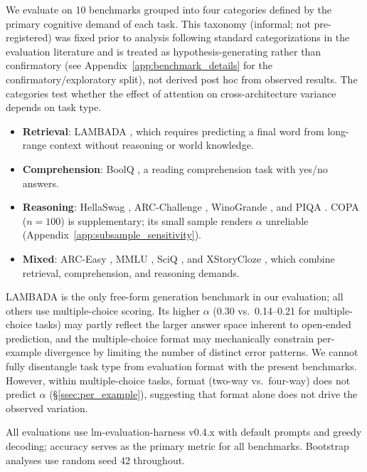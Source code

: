 We evaluate on 10 benchmarks grouped into four categories defined by the primary cognitive demand of each task. This taxonomy (informal; not pre-registered) was fixed prior to analysis following standard categorizations in the evaluation literature \citep{arora2024zoology} and is treated as hypothesis-generating rather than confirmatory (see Appendix~\ref{app:benchmark_details} for the confirmatory/exploratory split), not derived post hoc from observed results. The categories test whether the effect of attention on cross-architecture variance depends on task type.

\begin{itemize}
    \item \textbf{Retrieval}: LAMBADA \citep{paperno2016lambada}, which requires predicting a final word from long-range context without reasoning or world knowledge.
    \item \textbf{Comprehension}: BoolQ \citep{clark2019boolq}, a reading comprehension task with yes/no answers.
    \item \textbf{Reasoning}: HellaSwag \citep{zellers2019hellaswag}, ARC-Challenge \citep{clark2018arc}, WinoGrande \citep{sakaguchi2020winogrande}, and PIQA \citep{bisk2020piqa}. COPA \citep{roemmele2011copa} ($n = 100$) is supplementary; its small sample renders $\alpha$ unreliable (Appendix~\ref{app:subsample_sensitivity}).
    \item \textbf{Mixed}: ARC-Easy \citep{clark2018arc}, MMLU \citep{hendrycks2021mmlu}, SciQ \citep{welbl2017sciq}, and XStoryCloze \citep{lin2022xstorycloze}, which combine retrieval, comprehension, and reasoning demands.
\end{itemize}

LAMBADA is the only free-form generation benchmark in our evaluation; all others use multiple-choice scoring. Its higher $\alpha$ (0.30 vs.\ 0.14--0.21 for multiple-choice tasks) may partly reflect the larger answer space inherent to open-ended prediction, and the multiple-choice format may mechanically constrain per-example divergence by limiting the number of distinct error patterns. We cannot fully disentangle task type from evaluation format with the present benchmarks. However, within multiple-choice tasks, format (two-way vs.\ four-way) does not predict $\alpha$ (\S\ref{ssec:per_example}), suggesting that format alone does not drive the observed variation.

All evaluations use lm-evaluation-harness v0.4.x \citep{gao2024lmeval} with default prompts and greedy decoding; accuracy serves as the primary metric for all benchmarks. Bootstrap analyses use random seed 42 throughout.

